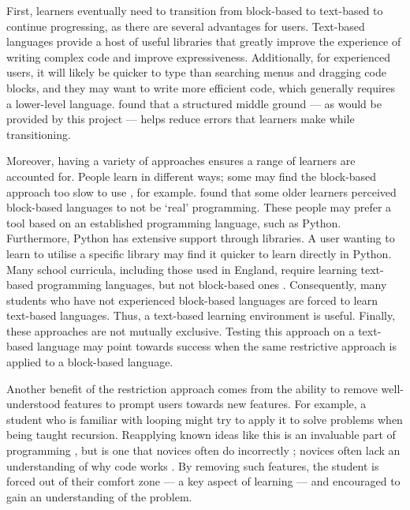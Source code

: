 First, learners eventually need to transition from block-based to text-based to continue progressing, as there are several advantages for users. Text-based languages provide a host of useful libraries that greatly improve the experience of writing complex code and improve expressiveness. Additionally, for experienced users, it will likely be quicker to type than searching menus and dragging code blocks, and they may want to write more efficient code, which generally requires a lower-level language. \citet{kazemitabaar_scaffolding_2023} found that a structured middle ground --- as would be provided by this project --- helps reduce errors that learners make while transitioning.

Moreover, having a variety of approaches ensures a range of learners are accounted for. People learn in different ways; some may find the block-based approach too slow to use \cite{weintrop_block_2015}, for example. \citet{weintrop_block_2015} found that some older learners perceived block-based languages to not be `real' programming. These people may prefer a tool based on an established programming language, such as Python. Furthermore, Python has extensive support through libraries. A user wanting to learn to utilise a specific library may find it quicker to learn directly in Python. Many school curricula, including those used in England, require learning text-based programming languages, but not block-based ones \cite{noauthor_national_2013}. Consequently, many students who have not experienced block-based languages are forced to learn text-based languages. Thus, a text-based learning environment is useful. Finally, these approaches are not mutually exclusive. Testing this approach on a text-based language may point towards success when the same restrictive approach is applied to a block-based language.

Another benefit of the restriction approach comes from the ability to remove well-understood features to prompt users towards new features. For example, a student who is familiar with looping might try to apply it to solve problems when being taught recursion. Reapplying known ideas like this is an invaluable part of programming \cite{soloway_empirical_1984}, but is one that novices often do incorrectly \cite{robins_learning_2003}; novices often lack an understanding of why code works \cite{lister_multi-national_2005}. By removing such features, the student is forced out of their comfort zone --- a key aspect of learning \cite{chaiklin_zone_2003} --- and encouraged to gain an understanding of the problem.

